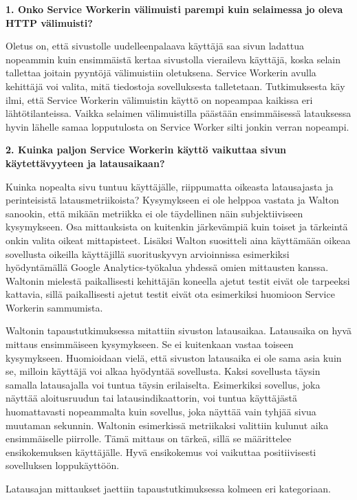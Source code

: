 \documentclass{tktltiki}
\begin{document}
\textbf{1. Onko Service Workerin välimuisti parempi kuin selaimessa jo oleva HTTP välimuisti?}

Oletus on, että sivustolle uudelleenpalaava käyttäjä saa sivun ladattua nopeammin kuin ensimmäistä kertaa sivustolla vieraileva käyttäjä, koska selain tallettaa joitain pyyntöjä välimuistiin oletuksena. Service Workerin avulla kehittäjä voi valita, mitä tiedostoja sovelluksesta talletetaan. Tutkimuksesta käy ilmi, että Service Workerin välimuistin käyttö on nopeampaa kaikissa eri lähtötilanteissa. Vaikka selaimen välimuistilla päästään ensimmäisessä latauksessa hyvin lähelle samaa lopputulosta on Service Worker silti jonkin verran nopeampi.

\textbf{2. Kuinka paljon Service Workerin käyttö vaikuttaa sivun käytettävyyteen ja latausaikaan?}

Kuinka nopealta sivu tuntuu käyttäjälle, riippumatta oikeasta latausajasta ja perinteisistä latausmetriikoista? Kysymykseen ei ole helppoa vastata ja Walton \cite{Walton} sanookin, että mikään metriikka ei ole täydellinen näin subjektiiviseen kysymykseen. Osa mittauksista on kuitenkin järkevämpiä kuin toiset ja tärkeintä onkin valita oikeat mittapisteet. Lisäksi Walton suositteli aina käyttämään oikeaa sovellusta oikeilla käyttäjillä suorituskyvyn arvioinnissa esimerkiksi hyödyntämällä Google Analytics-työkalua yhdessä omien mittausten kanssa. Waltonin mielestä paikallisesti kehittäjän koneella ajetut testit eivät ole tarpeeksi kattavia, sillä paikallisesti ajetut testit eivät ota esimerkiksi huomioon Service Workerin sammumista.

Waltonin tapaustutkimuksessa \cite{Walton} mitattiin sivuston latausaikaa. Latausaika on hyvä mittaus ensimmäiseen kysymykseen. Se ei kuitenkaan vastaa toiseen kysymykseen. Huomioidaan vielä, että sivuston latausaika ei ole sama asia kuin se, milloin käyttäjä voi alkaa hyödyntää sovellusta. Kaksi sovellusta täysin samalla latausajalla voi tuntua täysin erilaiselta. Esimerkiksi sovellus, joka näyttää aloitusruudun tai latausindikaattorin, voi tuntua käyttäjästä huomattavasti nopeammalta kuin sovellus, joka näyttää vain tyhjää sivua muutaman sekunnin. Waltonin esimerkissä \cite{Walton} metriikaksi valittiin kulunut aika ensimmäiselle piirrolle. Tämä mittaus on tärkeä, sillä se määrittelee ensikokemuksen käyttäjälle. Hyvä ensikokemus voi vaikuttaa positiivisesti sovelluksen loppukäyttöön. 

Latausajan mittaukset jaettiin tapaustutkimuksessa kolmeen eri kategoriaan.
\end{document}
